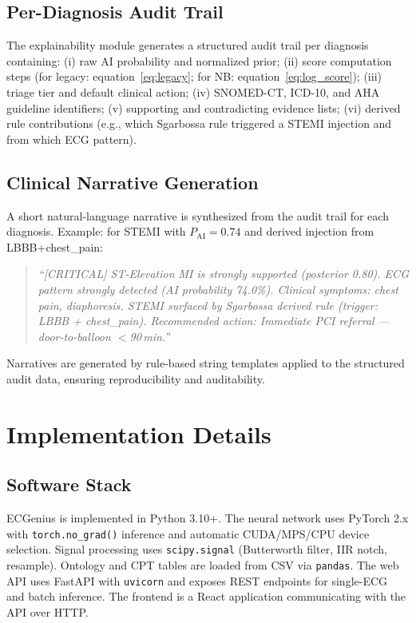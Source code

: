 \documentclass[journal]{IEEEtran}
\begin{document}
\subsection{Per-Diagnosis Audit Trail}

The explainability module generates a structured audit trail per
diagnosis containing:
(i) raw AI probability and normalized prior;
(ii) score computation steps (for legacy: equation~\ref{eq:legacy};
     for NB: equation~\ref{eq:log_score});
(iii) triage tier and default clinical action;
(iv) SNOMED-CT, ICD-10, and AHA guideline identifiers;
(v) supporting and contradicting evidence lists;
(vi) derived rule contributions (e.g., which Sgarbossa rule triggered
a STEMI injection and from which ECG pattern).

\subsection{Clinical Narrative Generation}

A short natural-language narrative is synthesized from the audit
trail for each diagnosis.
Example: for STEMI with $P_{\text{AI}} = 0.74$ and derived injection
from LBBB+chest\_pain:
\begin{quote}
\textit{``[CRITICAL] ST-Elevation MI is strongly supported (posterior
0.80). ECG pattern strongly detected (AI probability 74.0\%).
Clinical symptoms: chest pain, diaphoresis. STEMI surfaced by
Sgarbossa derived rule (trigger: LBBB + chest\_pain). Recommended
action: Immediate PCI referral — door-to-balloon $<$90\,min.''}
\end{quote}
Narratives are generated by rule-based string templates applied to
the structured audit data, ensuring reproducibility and
auditability.

\section{Implementation Details}
\label{sec:impl}

\subsection{Software Stack}

ECGenius is implemented in Python 3.10+.
The neural network uses PyTorch 2.x with \texttt{torch.no\_grad()}
inference and automatic CUDA/MPS/CPU device selection.
Signal processing uses \texttt{scipy.signal} (Butterworth filter,
IIR notch, resample).
Ontology and CPT tables are loaded from CSV via \texttt{pandas}.
The web API uses FastAPI with \texttt{uvicorn} and exposes REST
endpoints for single-ECG and batch inference.
The frontend is a React application communicating with the API over
HTTP.
\end{document}

